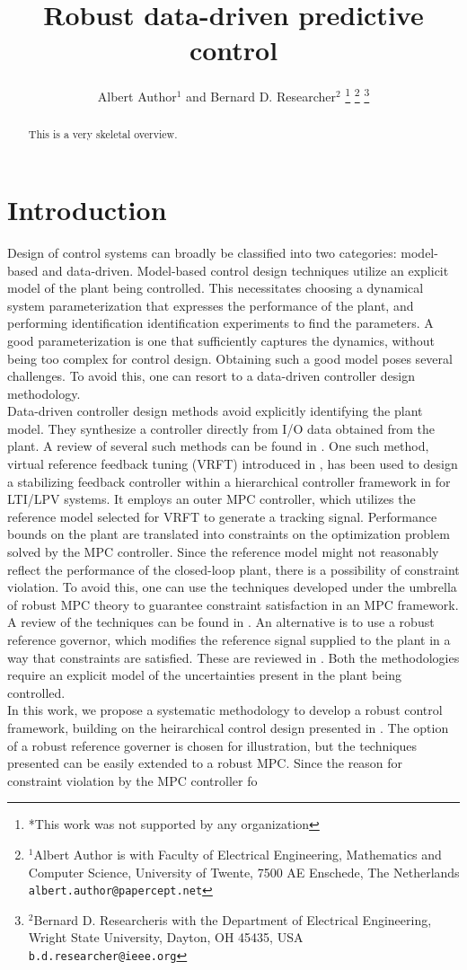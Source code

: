 \documentclass[letterpaper, 10 pt, conference]{ieeeconf}  %
\title{\LARGE \bf
Robust data-driven predictive control
}
\author{Albert Author$^{1}$ and Bernard D. Researcher$^{2}$%
\thanks{*This work was not supported by any organization}%
\thanks{$^{1}$Albert Author is with Faculty of Electrical Engineering, Mathematics and Computer Science,
        University of Twente, 7500 AE Enschede, The Netherlands
        {\tt\small albert.author@papercept.net}}%
\thanks{$^{2}$Bernard D. Researcheris with the Department of Electrical Engineering, Wright State University,
        Dayton, OH 45435, USA
        {\tt\small b.d.researcher@ieee.org}}%
}
\begin{document}
\maketitle
\thispagestyle{empty}
\pagestyle{empty}


\begin{abstract}

This is a very skeletal overview.

\end{abstract}


\section{Introduction}
Design of control systems can broadly be classified into two categories: model-based and data-driven. Model-based control design techniques utilize an explicit model of the plant being controlled. This necessitates choosing a dynamical system parameterization that  expresses the performance of the plant, and performing identification identification experiments to find the parameters. A good parameterization is one that sufficiently captures the dynamics, without being too complex for control design. Obtaining such a good model poses several challenges. To avoid this, one can resort to a data-driven controller design methodology. \\
\indent
Data-driven controller design methods avoid explicitly identifying the plant model. They synthesize a controller directly from I/O data obtained from the plant. A review of several such methods can be found in \cite{HOU20133}. One such method, virtual reference feedback tuning (VRFT) introduced in \cite{CAMPI20021337}, has been used to design a stabilizing feedback controller within a hierarchical controller framework in \cite{7932940} for LTI/LPV systems. It employs an outer MPC controller, which utilizes the reference model selected for VRFT to generate a tracking signal. Performance bounds on the plant are translated into constraints on the optimization problem solved by the MPC controller. Since the reference model might not reasonably reflect the performance of the closed-loop plant, there is a possibility of constraint violation.
To avoid this, one can use the techniques developed under the umbrella of robust MPC theory to guarantee constraint satisfaction in an MPC framework. A review of the techniques can be found in \cite{10.1007/BFb0109870}. An alternative is to use a robust reference governor, which modifies the reference signal supplied to the plant in a way that constraints are satisfied. These are reviewed in \cite{GARONE2017306}. Both the methodologies require an explicit model of the uncertainties present in the plant being controlled. 
\\ \indent
In this work, we propose a systematic methodology to develop a robust control framework, building on the heirarchical control design presented in \cite{7932940}. The option of a robust reference governer is chosen for illustration, but the techniques presented can be easily extended to a robust MPC. Since the reason for constraint violation by the MPC controller fo 
\end{document}
